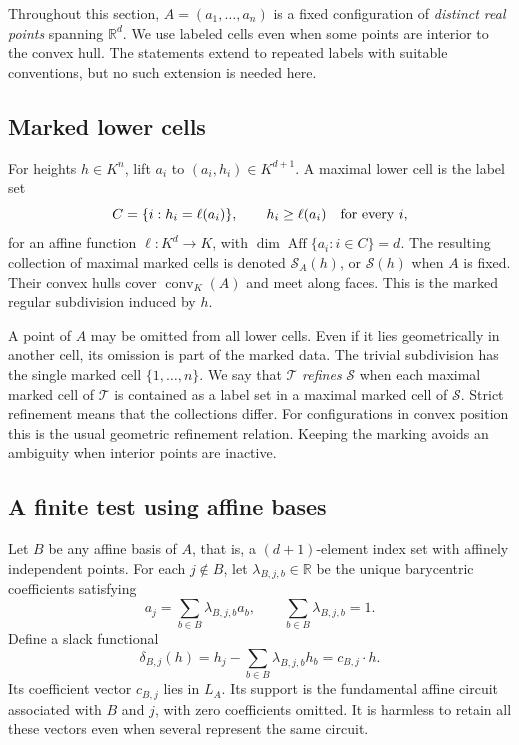 \documentclass[11pt,a4paper]{article}
\numberwithin{equation}{section}
\theoremstyle{plain}
\newcommand{\R}{\mathbb R}
\newcommand{\conv}{\operatorname{conv}}
\newcommand{\cS}{\mathcal S}
\newcommand{\Aff}{\operatorname{Aff}}
\begin{document}
Throughout this section, $A=(a_1,\ldots,a_n)$ is a fixed configuration of
\emph{distinct real points} spanning $\R^d$. We use labeled cells even when
some points are interior to the convex hull. The statements extend to
repeated labels with suitable conventions, but no such extension is needed
here.

\subsection{Marked lower cells}
For heights $h\in K^n$, lift $a_i$ to $(a_i,h_i)\in K^{d+1}$. A maximal
lower cell is the label set
\[
 C=\{i:h_i=\ell(a_i)\},\qquad h_i\ge\ell(a_i)\quad\hbox{for every }i,
\]
for an affine function $\ell:K^d\to K$, with
$\dim\Aff\{a_i:i\in C\}=d$. The resulting collection of maximal marked
cells is denoted $\cS_A(h)$, or $\cS(h)$ when $A$ is fixed. Their convex
hulls cover $\conv_K(A)$ and meet along faces. This is the marked regular
subdivision induced by $h$.

A point of $A$ may be omitted from all lower cells. Even if it lies
geometrically in another cell, its omission is part of the marked data.
The trivial subdivision has the single marked cell $\{1,\ldots,n\}$.
We say that $\mathcal T$ \emph{refines} $\mathcal S$ when each maximal
marked cell of $\mathcal T$ is contained as a label set in a maximal marked
cell of $\mathcal S$. Strict refinement means that the collections differ.
For configurations in convex position this is the usual geometric
refinement relation. Keeping the marking avoids an ambiguity when interior
points are inactive.

\subsection{A finite test using affine bases}
Let $B$ be any affine basis of $A$, that is, a $(d+1)$-element index set
with affinely independent points. For each $j\notin B$, let
$\lambda_{B,j,b}\in\R$ be the unique barycentric coefficients satisfying
\[
 a_j=\sum_{b\in B}\lambda_{B,j,b}a_b,
 \qquad \sum_{b\in B}\lambda_{B,j,b}=1.
\]
Define a slack functional
\begin{equation}\label{poly:ts:eq:slack}
 \delta_{B,j}(h)=h_j-\sum_{b\in B}\lambda_{B,j,b}h_b
               =c_{B,j}\cdot h.
\end{equation}
Its coefficient vector $c_{B,j}$ lies in $L_A$. Its support is the
fundamental affine circuit associated with $B$ and $j$, with zero
coefficients omitted. It is harmless to retain all these vectors even when
several represent the same circuit.
\end{document}
